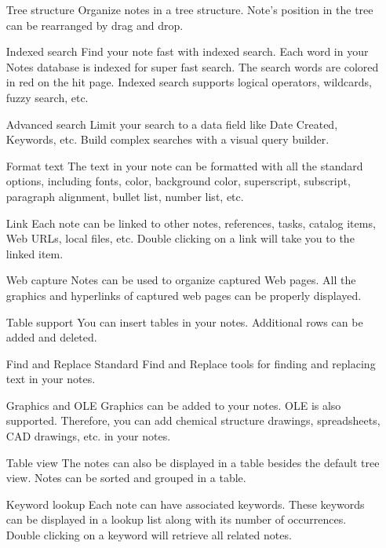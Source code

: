 \begin{itemize}
 \item[Tree structure] Organize notes in a tree structure. Note's position
 in the tree can be rearranged by drag and drop.

 \item[Indexed search] Find your note fast with indexed search. Each
 word in your Notes database is indexed for super fast search. The
 search words are colored in red on the hit page. Indexed search
 supports logical operators, wildcards, fuzzy search, etc.

 \item[Advanced search] Limit your search to a data field like Date
 Created, Keywords, etc. Build complex searches with a visual query
 builder.

 \item[Format text] The text in your note can be formatted with all the
 standard options, including fonts, color, background color,
 superscript, subscript, paragraph alignment, bullet list, number list,
 etc.

 \item[Link] Each note can be linked to other notes, references, tasks,
 catalog items, Web URLs, local files, etc. Double clicking on a link
 will take you to the linked item.

 \item[Web capture] Notes can be used to organize captured Web pages.
  All the graphics and hyperlinks of captured web pages can be
 properly displayed.

 \item[Table support] You can insert tables in your notes. Additional rows
 can be added and deleted.

 \item[Find and Replace] Standard Find and Replace tools for finding and
 replacing text in your notes.

 \item[Graphics and OLE] Graphics can be added to your notes. OLE is
 also supported. Therefore, you can add chemical structure
 drawings, spreadsheets, CAD drawings, etc. in your notes.

 \item[Table view] The notes can also be displayed in a table besides the
 default tree view. Notes can be sorted and grouped in a table.

 \item[Keyword lookup] Each note can have associated keywords. These
 keywords can be displayed in a lookup list along with its number of
 occurrences. Double clicking on a keyword will retrieve all related
 notes.


\end{itemize}

